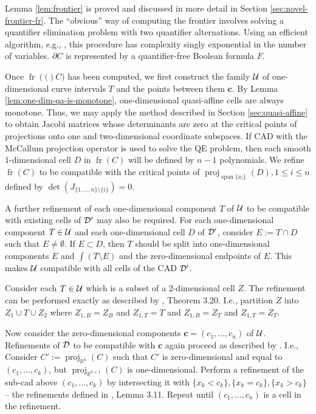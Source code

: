 \documentclass[
]{book}
\theoremstyle{definition}
\theoremstyle{definition}
\theoremstyle{definition}
\theoremstyle{definition}
\theoremstyle{remark}
\begin{document}
Lemma \ref{lem:frontier} is proved and discussed in more detail in Section \ref{sec:novel-frontier-fr}.
The ``obvious'' way of computing the frontier involves solving a quantifier elimination problem with two quantifier alternations. Using an efficient algorithm, e.g., \citep[Algorithm 14.21]{bpr2006}, this procedure has complexity singly exponential in the number of variables. \(\partial C\) is represented by a quantifier-free Boolean formula \(F\).

Once \({\operatorname{fr} \left( ( \right)}C)\) has been computed, we first construct the family \(\cal U\) of one-dimensional curve intervals \(T\) and the points between them \(\mathbf{c}\). By Lemma \ref{lem:one-dim-qa-is-monotone}, one-dimensional quasi-affine cells are always monotone. Thus, we may apply the method described in Section \ref{sec:quasi-affine} to obtain Jacobi matrices whose determinants are zero at the critical points of projections onto one and two-dimensional coordinate subspaces.
If CAD with the McCallum projection operator is used to solve the QE problem, then each smooth 1-dimensional cell \(D\) in \({\operatorname{fr} \left( C \right)}\) will be defined by \(n-1\) polynomials. We refine \({\operatorname{fr} \left( C \right)}\) to be compatible with the critical points of \({\operatorname{proj}_{{\operatorname{span} \{x_i\}}}}(D), 1\le i \le n\) defined by \(\det(J_{\{1,\ldots,n\}\setminus \{i\}}) = 0\).

A further refinement of each one-dimensional component \(T\) of \(\cal U\) to be compatible with existing cells of \(\cal D'\) may also be required.
For each one-dimensional component \(T \in {\cal U}\) and each one-dimensional cell \(D\) of \(\cal D'\), consider \(E := T \cap D\) such that \(E \ne \emptyset\).
If \(E \subset D\), then \(T\) should be split into one-dimensional components \(E\) and \(\int(T \setminus E)\) and the zero-dimensional endpoints of \(E\). This makes \(\cal U\) compatible with all cells of the CAD \(\cal D'\).

Consider each \(T \in {\cal U}\) which is a subset of a 2-dimensional cell \(Z\). The refinement can be performed exactly as described by \citet{bgv15}, Theorem 3.20. I.e., partition \(Z\) into \(Z_1 \cup T \cup Z_2\) where \(Z_{1,B}=Z_B\) and \(Z_{1,T} = T\) and \(Z_{1,B}=Z_T\) and \(Z_{1,T} = Z_T\).

Now consider the zero-dimensional components \(\mathbf{c} = (c_1,\ldots,c_n)\) of \(\cal U\). Refinements of \(\cal D\) to be compatible with \(\mathbf{c}\) again proceed as described by \citet{bgv15}. I.e., Consider \(C' := {\operatorname{proj}_{\mathbb{R}^{k}}}(C)\) such that \(C'\) is zero-dimensional and equal to \((c_1,\ldots,c_k)\), but \({\operatorname{proj}_{\mathbb{R}^{k+1}}}(C)\) is one-dimensional. Perform a refinement of the sub-cad above \((c_1,\ldots,c_k)\) by intersecting it with \(\{ x_k < c_k \}, \{ x_k = c_k \}, \{ x_k > c_k \}\) -- the refinements defined in \citet{bgv15}, Lemma 3.11. Repeat until \((c_1,\ldots,c_n)\) is a cell in the refinement.
\end{document}
